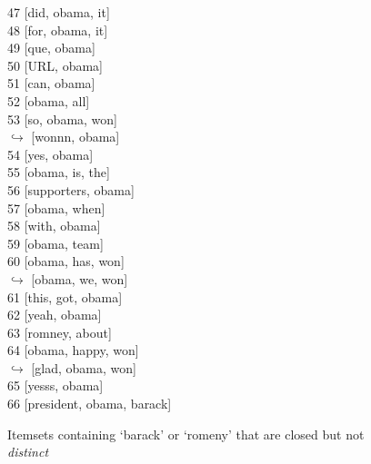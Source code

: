 \documentclass[letterpaper,12pt,titlepage,oneside,final]{book}
\begin{document}
\begin{figure}[h]
\begin{minipage}[t]{0.3\textwidth}
     
     47 [did, obama, it] \\
     48 [for, obama, it] \\ 
     49 [que, obama] \\
     50 [URL, obama] \\
     51 [can, obama] \\
     52 [obama, all] \\
     53 [so, obama, won] \\
     $\hookrightarrow$ [wonnn, obama] \\
     54 [yes, obama] \\
     55 [obama, is, the] \\
     56 [supporters, obama] \\
     57 [obama, when] \\
     58 [with, obama] \\
     59 [obama, team] \\
     60 [obama, has, won] \\
     $\hookrightarrow$ [obama, we, won]\\
     61 [this, got, obama] \\
     62 [yeah, obama] \\
     63 [romney, about] \\
     64 [obama, happy, won] \\
    $\hookrightarrow$ [glad, obama, won] \\
     65 [yesss, obama] \\
     66 [president, obama, barack] 
\end{minipage}
\caption{Itemsets containing `barack' or `romeny' that are closed but not \emph{distinct}}
\label{fig:closedNDistinct}
\end{figure}







\end{document}
